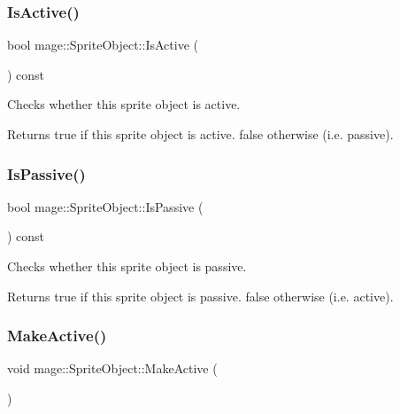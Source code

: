 \subsubsection{\texorpdfstring{Is\+Active()}{IsActive()}}
{\footnotesize\ttfamily bool mage\+::\+Sprite\+Object\+::\+Is\+Active (\begin{DoxyParamCaption}{ }\end{DoxyParamCaption}) const\hspace{0.3cm}{\ttfamily [noexcept]}}

Checks whether this sprite object is active.

\begin{DoxyReturn}{Returns}
{\ttfamily true} if this sprite object is active. {\ttfamily false} otherwise (i.\+e. passive). 
\end{DoxyReturn}
\hypertarget{classmage_1_1_sprite_object_a194682f23dbdf7ce5a7345eaba4c2fa1}{}\label{classmage_1_1_sprite_object_a194682f23dbdf7ce5a7345eaba4c2fa1} 
\subsubsection{\texorpdfstring{Is\+Passive()}{IsPassive()}}
{\footnotesize\ttfamily bool mage\+::\+Sprite\+Object\+::\+Is\+Passive (\begin{DoxyParamCaption}{ }\end{DoxyParamCaption}) const\hspace{0.3cm}{\ttfamily [noexcept]}}

Checks whether this sprite object is passive.

\begin{DoxyReturn}{Returns}
{\ttfamily true} if this sprite object is passive. {\ttfamily false} otherwise (i.\+e. active). 
\end{DoxyReturn}
\hypertarget{classmage_1_1_sprite_object_a145bdced3ec8ef41dfaf615f4ad7b1ef}{}\label{classmage_1_1_sprite_object_a145bdced3ec8ef41dfaf615f4ad7b1ef} 
\subsubsection{\texorpdfstring{Make\+Active()}{MakeActive()}}
{\footnotesize\ttfamily void mage\+::\+Sprite\+Object\+::\+Make\+Active (\begin{DoxyParamCaption}{ }\end{DoxyParamCaption})\hspace{0.3cm}{\ttfamily [noexcept]}}

